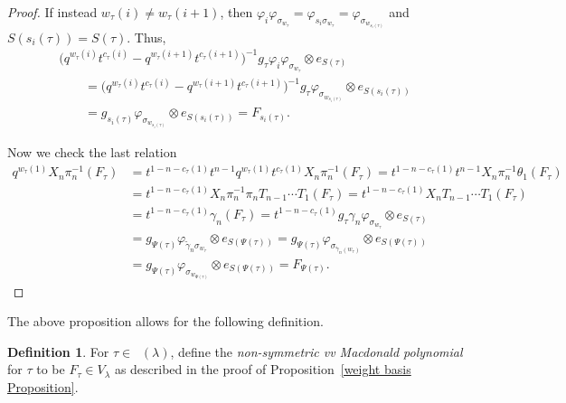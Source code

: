 \documentclass[pdftex]{sigma}
\numberwithin{equation}{section}
\theoremstyle{definition}
\newtheorem{Definition}[Theorem]{Definition}
\DeclareMathOperator{\PSYT}{\mathrm{PSYT}_{\geq 0}}
\begin{document}
\begin{proof}
 If instead $w_{\tau}(i) \neq w_{\tau}(i+1)$, then $\varphi_{i}\varphi_{\sigma_{w_{\tau}}} = \varphi_{s_i\sigma_{w_{\tau}}} = \varphi_{\sigma_{w_{s_i(\tau)}}}$ and $S(s_i(\tau)) = S(\tau)$. Thus,
 \begin{gather*}
 \bigl( q^{w_{\tau}(i)}t^{c_{\tau}(i)}-q^{w_{\tau}(i+1)}t^{c_{\tau}(i+1)}\bigr)^{-1}g_{\tau} \varphi_{i}\varphi_{\sigma_{w_{\tau}}} \otimes e_{S(\tau)} \\
 \qquad = \bigl( q^{w_{\tau}(i)}t^{c_{\tau}(i)}-q^{w_{\tau}(i+1)}t^{c_{\tau}(i+1)}\bigr)^{-1}g_{\tau}\varphi_{\sigma_{w_{s_i(\tau)}}} \otimes e_{S(s_i(\tau))} \\
 \qquad = g_{s_i(\tau)}\varphi_{\sigma_{w_{s_i(\tau)}}} \otimes e_{S(s_i(\tau))} = F_{s_i(\tau)}.
 \end{gather*}

 Now we check the last relation
 \begin{align*}
 q^{w_{\tau}(1)}X_n\pi_{n}^{-1}(F_{\tau}) &
 = t^{1-n-c_{\tau}(1)}t^{n-1}q^{w_{\tau}(1)}t^{c_{\tau}(1)}X_n\pi_{n}^{-1}(F_{\tau}) = t^{1-n-c_{\tau}(1)} t^{n-1}X_n\pi_{n}^{-1}\theta_1(F_{\tau}) \\
 & = t^{1-n-c_{\tau}(1)} X_n\pi_{n}^{-1}\pi_nT_{n-1}\cdots T_1(F_{\tau}) =t^{1-n-c_{\tau}(1)}X_nT_{n-1}\cdots T_1(F_{\tau}) \\
 &= t^{1-n-c_{\tau}(1)}\gamma_n(F_{\tau}) = t^{1-n-c_{\tau}(1)} g_{\tau} \gamma_n\varphi_{\sigma_{w_{\tau}}} \otimes e_{S(\tau)} \\
 &= g_{\Psi(\tau)} \varphi_{\widetilde{\gamma}_n\sigma_{w_{\tau}}} \otimes e_{S(\Psi(\tau))} = g_{\Psi(\tau)} \varphi_{\sigma_{\widetilde{\gamma}_n (w_{\tau})}} \otimes e_{S(\Psi(\tau))} \\
 &= g_{\Psi(\tau)} \varphi_{\sigma_{w_{\Psi(\tau)}}} \otimes e_{S(\Psi(\tau))}
 = F_{\Psi(\tau)}. \tag*{\qed}
 \end{align*} \renewcommand{\qed}{}
\end{proof}

The above proposition allows for the following definition.

\begin{Definition}
 For $\tau \in \PSYT(\lambda)$, define the \textit{non-symmetric vv Macdonald polynomial} for $\tau$ to be $F_{\tau} \in V_{\lambda}$ as described in the proof of Proposition~\ref{weight basis Proposition}.
\end{Definition}
\end{document}
